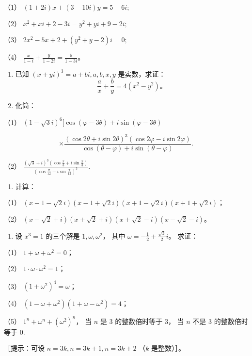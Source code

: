 （1） \((1 + 2i)x + (3 - 10i)y = 5 - 6i;\)

（2） \(x^{2} + xi + 2 - 3i = y^{2} + yi + 9 - 2i;\)

（3） \(2x^{2} - 5x + 2 + (y^{2} + y - 2)i = 0;\)

（4） \(\frac{x}{1 - i} + \frac{y}{1 - 2i} = \frac{5}{1 - 3i}\)。

\begin{enumerate}[start=7]
\item
  已知 \((x + yi)^3 = a + bi, a, b, x, y\) 是实数，求证：
\[
\frac {a}{x} + \frac {b}{y} = 4 (x ^ {2} - y ^ {2})\text{。}
\]
\item
  化简：
\end{enumerate}

（1）
\((1 - \sqrt{3} i)^{6}[\cos (\varphi - 3\theta) + i\sin (\varphi - 3\theta)\)

\[
\times \frac {(\cos 2 \theta + i \sin 2 \theta) ^ {3} (\cos 2 \varphi - i \sin 2 \varphi)}{\cos (\theta - \varphi) + i \sin (\theta - \varphi)}.
\]

（2）
\(\frac{(\sqrt{3} + i)^3\left(\cos\frac{\pi}{3} + i\sin\frac{\pi}{3}\right)}{\left(\cos\frac{\pi}{12} - i\sin\frac{\pi}{12}\right)^3}.\)

\begin{enumerate}[start=9]
\item
  计算：
\end{enumerate}

（1）
\((x - 1 - \sqrt{2} i)(x - 1 + \sqrt{2} i)(x + 1 - \sqrt{2} i)(x + 1 + \sqrt{2} i)\)；

（2）
\((x - \sqrt{2} + i)(x + \sqrt{2} + i)(x + \sqrt{2} - i)(x - \sqrt{2} - i)\)。

\begin{enumerate}[start=10]
\item
  设 \(x^{3} = 1\) 的三个解是 \(1, \omega, \omega^{2}\)， 其中
  \(\omega = -\frac{1}{2} + \frac{\sqrt{3}}{2} i\)。 求证：
\end{enumerate}

（1） \(1 + \omega + \omega^2 = 0\)；

（2） \(1 \cdot \omega \cdot \omega^2 = 1\)；

（3） \((1 + \omega^2)^4 = \omega\)；

（4） \((1 - \omega + \omega^2)(1 + \omega - \omega^2) = 4\)；

（5） \(1^{n} + \omega^{n} + (\omega^{2})^{n}\)， 当 \(n\) 是 3
的整数倍时等于 3， 当 \(n\) 不是 3 的整数倍时等于 0.

［提示：可设 \(n = 3k, n = 3k + 1, n = 3k + 2\) （\(k\) 是整数）］。

